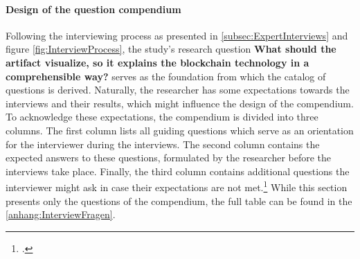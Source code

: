 \paragraph{Design of the question compendium} Following the interviewing process as presented in \ref{subsec:ExpertInterviews} and figure \ref{fig:InterviewProcess}, the study's research question \textbf{What should the artifact visualize, so it explains the blockchain technology in a comprehensible way?} serves as the foundation from which the catalog of questions is derived. Naturally, the researcher has some expectations towards the interviews and their results, which might influence the design of the compendium. To acknowledge these expectations, the compendium is divided into three columns. The first column lists all guiding questions which serve as an orientation for the interviewer during the interviews. The second column contains the expected answers to these questions, formulated by the researcher before the interviews take place. Finally, the third column contains additional questions the interviewer might ask in case their expectations are not met.\footcite[Cf.][p.431]{AghamanoukjanQualitativeInterviews2007} While this section presents only the questions of the compendium, the full table can be found in the \ref{anhang:InterviewFragen}.

